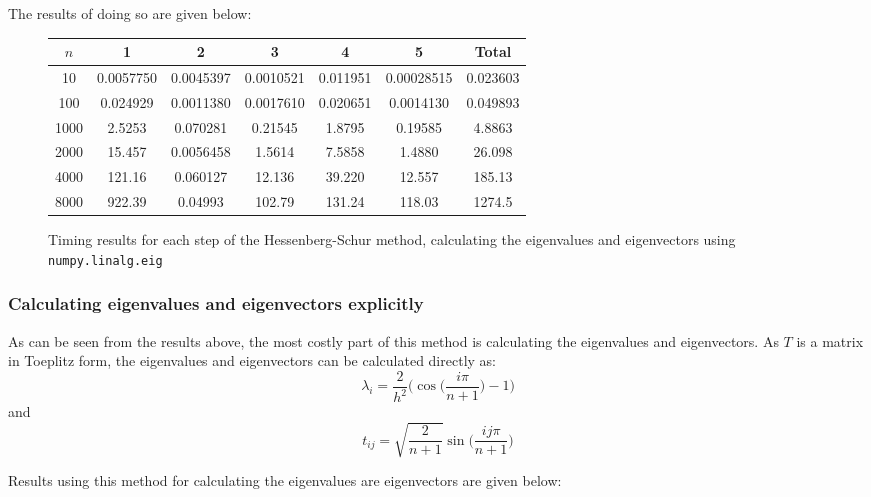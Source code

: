 \documentclass{article}
\numberwithin{equation}{section}
\begin{document}
The results of doing so are given below:

\begin{figure}
\begin{table}[H]
\centering
\begin{tabular}{|c|c|c|c|c|c|c|}
\hline
$n$ & 1 & 2 & 3 & 4 & 5 & Total \\
\hline
10 & 0.0057750 & 0.0045397 & 0.0010521 & 0.011951 & 0.00028515 & 0.023603 \\
100 & 0.024929 & 0.0011380 & 0.0017610 & 0.020651 & 0.0014130 & 0.049893 \\
1000 & 2.5253 & 0.070281 & 0.21545 & 1.8795 & 0.19585 & 4.8863 \\
2000 & 15.457 & 0.0056458 & 1.5614 & 7.5858 & 1.4880 & 26.098 \\
4000 & 121.16 & 0.060127 & 12.136 & 39.220 & 12.557 & 185.13 \\
8000 & 922.39 & 0.04993 & 102.79 & 131.24 & 118.03 & 1274.5  \\
\hline
\end{tabular}
\end{table}
\caption{Timing results for each step of the Hessenberg-Schur method, calculating the eigenvalues and eigenvectors using \texttt{numpy.linalg.eig}}
\end{figure}

\subsubsection*{Calculating eigenvalues and eigenvectors explicitly}

As can be seen from the results above, the most costly part of this method is calculating the eigenvalues and eigenvectors. As $T$ is a matrix in Toeplitz form, the eigenvalues and eigenvectors can be calculated directly as:
\[ \lambda_i = \frac{2}{h^2} \Big( \cos \Big( \frac{i \pi}{n+1} \Big) - 1 \Big) \]
and 
\[ t_{ij} = \sqrt{\frac{2}{n+1}} \sin \Big( \frac{ij \pi}{n+1}  \Big) \]

Results using this method for calculating the eigenvalues are eigenvectors are given below:
\end{document}
